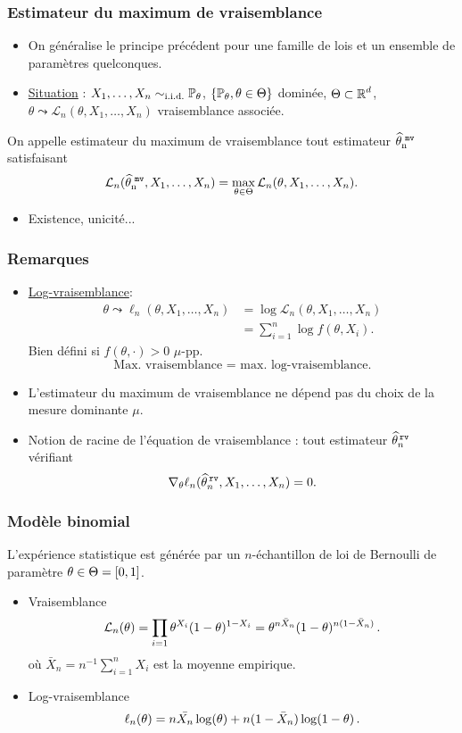 \begin{frame}
\frametitle{Estimateur du maximum de vraisemblance}
\begin{itemize}
\item On généralise le principe précédent pour une famille de lois et un ensemble de paramètres \alert{quelconques}.
\item \underline{Situation} : $X_1,\ldots, X_n\sim_{\text{i.i.d.}}\operatorname{{\mathbb P}}_\theta$, $\{\operatorname{{\mathbb P}}_\theta,\theta \in \Theta\}$ dominée, $\Theta \subset \operatorname{{\mathbb R}}^d$, $\theta \leadsto {\mathcal L}_n(\theta, X_1,\ldots, X_n)$ vraisemblance associée.
\end{itemize}
\begin{df}
On appelle \alert{ estimateur du maximum de vraisemblance} tout estimateur $\operatorname{\widehat \theta_n^{\,\,{\tt mv}}}$ satisfaisant
$${\mathcal L}_n(\operatorname{\widehat \theta_n^{\,\,{\tt mv}}},X_1,\ldots, X_n) = \max_{\theta \in \Theta} {\mathcal L}_n(\theta, X_1,\ldots, X_n).$$
\end{df}
\begin{itemize}
\item \alert{Existence, unicité...}
\end{itemize}
\end{frame}

\begin{frame}
\frametitle{Remarques}
\begin{itemize}
\item \underline{Log-vraisemblance}:
\begin{align*}\theta \leadsto \ell_n(\theta, X_1,\ldots, X_n)& = \log {\mathcal L}_n(\theta, X_1,\ldots, X_n)\\
& = \sum_{i = 1}^n \log f(\theta, X_i).
\end{align*}
\alert{Bien défini} si $f(\theta, \cdot) >0$ $\mu$-pp.
$$\text{Max. vraisemblance = max. log-vraisemblance.}$$
\item L'estimateur du maximum de vraisemblance \alert{ ne dépend pas} du choix de la mesure dominante $\mu$.
\item Notion de \alert{ racine de l'équation de vraisemblance} : tout estimateur $\widehat \theta_n^{\,{\tt rv}}$ vérifiant
$$\nabla_\theta \ell_n(\widehat \theta_n^{\,{\tt rv}}, X_1,\ldots, X_n) = 0.$$
\end{itemize}
\end{frame}

\begin{frame}
\frametitle{Modèle binomial}
L'expérience statistique est générée par un $n$-échantillon de loi de Bernoulli de paramètre $\theta \in \Theta= \left[0,1\right]$.
\begin{itemize}
\item \alert{Vraisemblance} 
$$
\mathcal{L}_n(\theta) = \prod_{i=1} \theta^{X_i} (1-\theta)^{1-X_i} = \theta^{n\bar{X}_n} (1-\theta)^{n (1 - \bar{X}_n)} \,. 
$$
où $\bar{X}_n = n^{-1} \sum_{i=1}^n X_i$ est la moyenne empirique.
\item \alert{Log-vraisemblance}
$$
\ell_n(\theta)= n \bar{X_n} \log(\theta) + n (1- \bar{X}_n) \log(1-\theta) \,.
$$
\end{itemize}
\end{frame}

